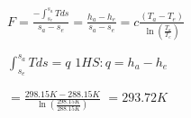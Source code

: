 \( F = \frac{- \int_{s_{e}}^{s_{a}} T d s}{s_{a} - s_{e}} = \frac{h_{a} - h_{e}}{s_{a} - s_{e}} = c \frac{(T_{a} - T_{e})}{\ln \left(\frac{T_{a}}{T_{e}}\right)} \)  

\( \int_{s_{e}}^{s_{a}} T d s = q \)  
\( 1HS: q = h_{a} - h_{e} \)  

\( = \frac{298.15 K - 288.15 K}{\ln \left(\frac{298.15 K}{288.15 K}\right)} \)  
\( = 293.72 K \)